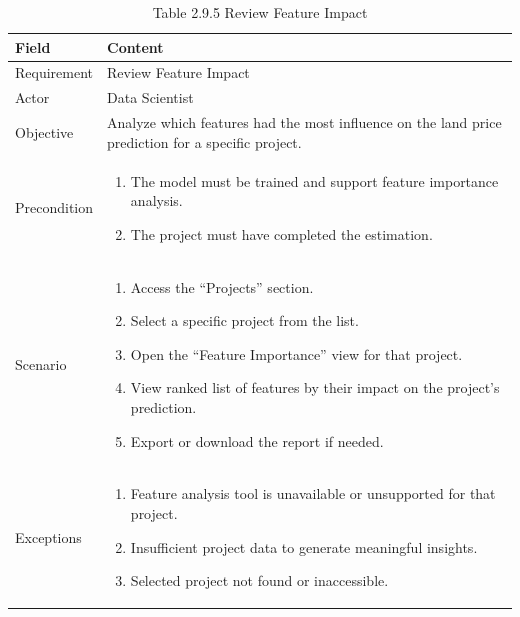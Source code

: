 \documentclass[12pt,oneside]{report}
\begin{document}
\begin{table}[H]
\centering
\caption{Table 2.9.5 Review Feature Impact}
\label{tab:ds-feature-impact}
\begin{tabularx}{\textwidth}{|p{3cm}|X|}
\hline
\textbf{Field} & \textbf{Content} \\ \hline

Requirement & Review Feature Impact \\ \hline

Actor & Data Scientist \\ \hline

Objective & Analyze which features had the most influence on the land price prediction for a specific project. \\ \hline

Precondition & 
\begin{minipage}[t]{0.75\textwidth}
\begin{enumerate}[leftmargin=*,label=\arabic*.]
\item The model must be trained and support feature importance analysis.
\item The project must have completed the estimation.
\end{enumerate}
\end{minipage} \\ \hline

Scenario &
\begin{minipage}[t]{0.75\textwidth}
\begin{enumerate}[leftmargin=*,label=\arabic*.]
\item Access the “Projects” section.
\item Select a specific project from the list.
\item Open the “Feature Importance” view for that project.
\item View ranked list of features by their impact on the project’s prediction.
\item Export or download the report if needed.
\end{enumerate}
\end{minipage} \\ \hline

Exceptions &
\begin{minipage}[t]{0.75\textwidth}
\begin{enumerate}[leftmargin=*,label=\arabic*.]
\item Feature analysis tool is unavailable or unsupported for that project.
\item Insufficient project data to generate meaningful insights.
\item Selected project not found or inaccessible.
\end{enumerate}
\end{minipage} \\ \hline

\end{tabularx}
\end{table}
\end{document}

